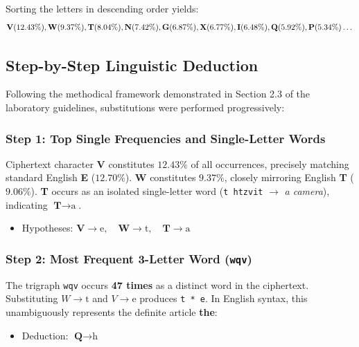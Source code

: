 \documentclass[12pt,a4paper]{article}
\begin{document}
Sorting the letters in descending order yields:
\begin{equation*}
    \text{\textbf{V}} (12.43\%), \text{\textbf{W}} (9.37\%), \text{\textbf{T}} (8.04\%), \text{\textbf{N}} (7.42\%), \text{\textbf{G}} (6.87\%), \text{\textbf{X}} (6.77\%), \text{\textbf{I}} (6.48\%), \text{\textbf{Q}} (5.92\%), \text{\textbf{P}} (5.34\%) \dots
\end{equation*}

\subsection{Step-by-Step Linguistic Deduction}

Following the methodical framework demonstrated in Section 2.3 of the laboratory guidelines, substitutions were performed progressively:

\subsubsection{Step 1: Top Single Frequencies and Single-Letter Words}
Ciphertext character \textbf{V} constitutes $12.43\%$ of all occurrences, precisely matching standard English \textbf{E} ($12.70\%$). \textbf{W} constitutes $9.37\%$, closely mirroring English \textbf{T} ($9.06\%$). \textbf{T} occurs as an isolated single-letter word (\texttt{t htzvit} $\to$ \textit{a camera}), indicating $\textbf{T} \to \text{a}$.
\begin{itemize}
    \item Hypotheses: $\textbf{V} \to \text{e}, \quad \textbf{W} \to \text{t}, \quad \textbf{T} \to \text{a}$
\end{itemize}

\subsubsection{Step 2: Most Frequent 3-Letter Word (\texttt{wqv})}
The trigraph \texttt{wqv} occurs \textbf{47 times} as a distinct word in the ciphertext. Substituting $W \to \text{t}$ and $V \to \text{e}$ produces \texttt{t * e}. In English syntax, this unambiguously represents the definite article \textbf{the}:
\begin{itemize}
    \item Deduction: $\textbf{Q} \to \text{h}$
\end{itemize}
\end{document}
